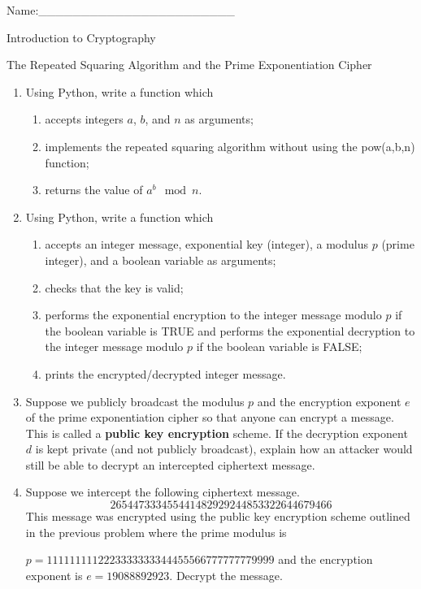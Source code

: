 \documentclass[12pt]{amsart}
\theoremstyle{definition}
\theoremstyle{remark}
\numberwithin{equation}{section}
\begin{document}
\begin{flushright}
Name:\_\_\_\_\_\_\_\_\_\_\_\_\_\_\_\_\_\_\_\_\_\_\_
\end{flushright}
\vspace{10pt}
\begin{center}
Introduction to Cryptography

The Repeated Squaring Algorithm and the Prime Exponentiation Cipher
\end{center}



\begin{enumerate}
\item Using Python, write a function which
\begin{enumerate}
\item accepts integers $a$, $b$, and $n$ as arguments;
\item implements the repeated squaring algorithm without using the pow(a,b,n) function;
\item returns the value of $a^b\mod n$.
\end{enumerate}

\item Using Python, write a function which
\begin{enumerate}
\item accepts an integer message, exponential key (integer), a modulus $p$ (prime integer), and a boolean variable as arguments;
\item checks that the key is valid;
\item performs the exponential encryption to the integer message modulo $p$ if the boolean variable is TRUE and performs the exponential decryption to the integer message modulo $p$ if the boolean variable is FALSE;
\item prints the encrypted/decrypted integer message.
\end{enumerate}
\item Suppose we publicly broadcast the modulus $p$ and the encryption exponent $e$ of the prime exponentiation cipher so that anyone can encrypt a message. This is called a {\bf public key encryption} scheme. If the decryption exponent $d$ is kept private (and not publicly broadcast), explain how an attacker would still be able to decrypt an intercepted ciphertext message.
\item Suppose we intercept the following ciphertext message. $$265447333455441482929244853322644679466$$ This message was encrypted using the public key encryption scheme outlined in the previous problem where the prime modulus is 

\noindent $p=1111111112223333333344455566777777779999$ and the encryption exponent is $e=19088892923$. Decrypt the message.
\end{enumerate}
\end{document}
